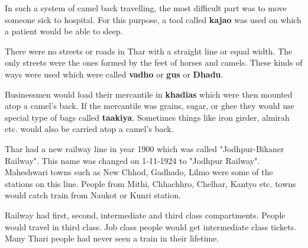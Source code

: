 In such a system of camel back travelling, the most difficult part was to move
someone sick to hospital. For this purpose, a tool called \textbf{kajao} was
used on which a patient would be able to sleep.

There were no streets or roads in Thar with a straight line or equal width. The
only streets were the ones formed by the feet of horses and camels. These kinds
of ways were used which were called \textbf{vadho} or \textbf{gus} or
\textbf{Dhadu}.

Businessmen would load their mercantile in \textbf{khadias} which were then
mounted atop a camel's back. If the mercantile was grains, sugar, or ghee they
would use special type of bags called \textbf{taakiya}. Sometimes things like
iron girder, almirah etc. would also be carried atop a camel's back. 

Thar had a new railway line in year 1900 which was called "Jodhpur-Bikaner
Railway". This name was changed on 1-11-1924 to "Jodhpur Railway". Maheshwari
towns such as New Chhod, Gadhado, Lilmo were some of the stations on this line.
People from Mithi, Chhachhro, Chelhar, Kantyo etc. towns would catch train from
Naukot or Kunri station.

Railway had first, second, intermediate and third class compartments. People
would travel in third class. Job class people would get intermediate class
tickets. Many Thari people had never seen a train in their lifetime.


